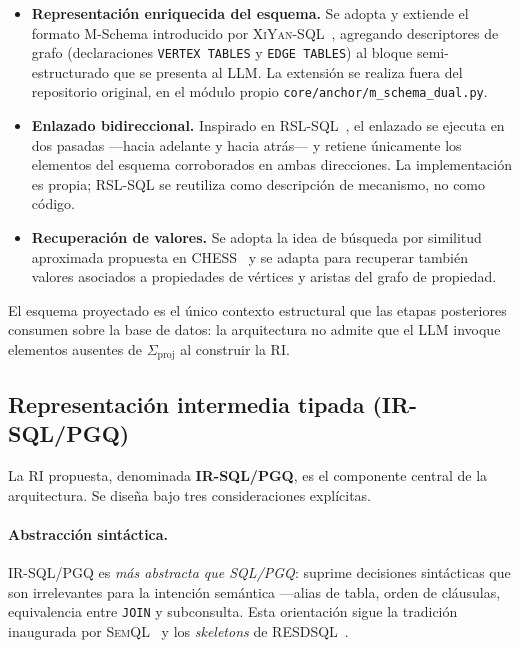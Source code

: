 \begin{itemize}
    \item \textbf{Representación enriquecida del esquema.} Se adopta y extiende el formato M-Schema introducido por \textsc{XiYan-SQL}~\cite{XiYan-SQL2024}, agregando descriptores de grafo (declaraciones \texttt{VERTEX TABLES} y \texttt{EDGE TABLES}) al bloque semi-estructurado que se presenta al \ac{LLM}. La extensión se realiza fuera del repositorio original, en el módulo propio \texttt{core/anchor/m\_schema\_dual.py}.
    \item \textbf{Enlazado bidireccional.} Inspirado en \textsc{RSL-SQL}~\cite{RSL-SQL2024}, el enlazado se ejecuta en dos pasadas ---hacia adelante y hacia atrás--- y retiene únicamente los elementos del esquema corroborados en ambas direcciones. La implementación es propia; RSL-SQL se reutiliza como descripción de mecanismo, no como código.
    \item \textbf{Recuperación de valores.} Se adopta la idea de búsqueda por similitud aproximada propuesta en \textsc{CHESS}~\cite{CHESS2024} y se adapta para recuperar también valores asociados a propiedades de vértices y aristas del grafo de propiedad.
\end{itemize}

El esquema proyectado es el único contexto estructural que las etapas posteriores consumen sobre la base de datos: la arquitectura no admite que el \ac{LLM} invoque elementos ausentes de $\Sigma_{\mathrm{proj}}$ al construir la \ac{RI}.

\subsection{Representación intermedia tipada (IR-SQL/PGQ)}
\label{subsec:prop-ri}

La \ac{RI} propuesta, denominada \textbf{IR-SQL/PGQ}, es el componente central de la arquitectura. Se diseña bajo tres consideraciones explícitas.

\paragraph{Abstracción sintáctica.} IR-SQL/PGQ es \emph{más abstracta que \ac{SQL}/\ac{PGQ}}: suprime decisiones sintácticas que son irrelevantes para la intención semántica ---alias de tabla, orden de cláusulas, equivalencia entre \texttt{JOIN} y subconsulta. Esta orientación sigue la tradición inaugurada por \textsc{SemQL}~\cite{IRNet} y los \emph{skeletons} de \textsc{RESDSQL}~\cite{RESDSQL2023}.

